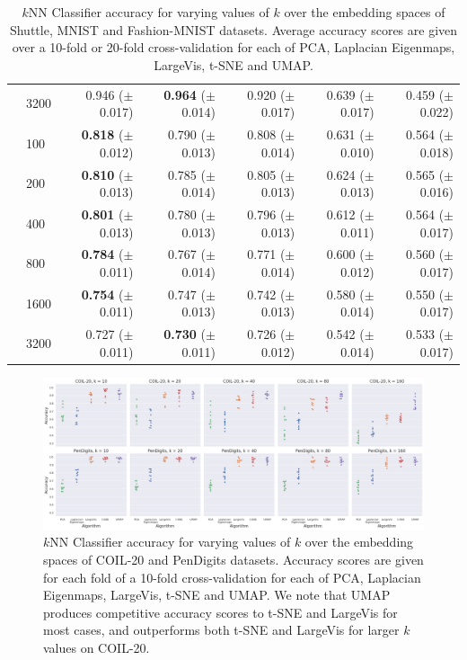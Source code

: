 \documentclass[12pt]{article}
\begin{document}
\begin{table}[!hptb]
\begin{tabular}{ll|rrrrr}
&3200	&0.946	{\tiny ($\pm$ 0.017)}&\textbf{0.964}	{\tiny ($\pm$ 0.014)}&0.920	{\tiny ($\pm$ 0.017)}&0.639	{\tiny ($\pm$ 0.017)}&0.459  {\tiny ($\pm$ 0.022)}\\
\cline{2-7}
\parbox[t]{2mm}{}
&100	&\textbf{0.818}	{\tiny ($\pm$ 0.012)}&0.790	{\tiny ($\pm$ 0.013)}&0.808	{\tiny ($\pm$ 0.014)}&0.631	{\tiny ($\pm$ 0.010)}&0.564  {\tiny ($\pm$ 0.018)}\\
&200	&\textbf{0.810}	{\tiny ($\pm$ 0.013)}&0.785	{\tiny ($\pm$ 0.014)}&0.805	{\tiny ($\pm$ 0.013)}&0.624	{\tiny ($\pm$ 0.013)}&0.565  {\tiny ($\pm$ 0.016)}\\
&400	&\textbf{0.801}	{\tiny ($\pm$ 0.013)}&0.780	{\tiny ($\pm$ 0.013)}&0.796	{\tiny ($\pm$ 0.013)}&0.612	{\tiny ($\pm$ 0.011)}&0.564  {\tiny ($\pm$ 0.017)}\\
&800	&\textbf{0.784}	{\tiny ($\pm$ 0.011)}&0.767	{\tiny ($\pm$ 0.014)}&0.771	{\tiny ($\pm$ 0.014)}&0.600	{\tiny ($\pm$ 0.012)}&0.560  {\tiny ($\pm$ 0.017)}\\
&1600	&\textbf{0.754}	{\tiny ($\pm$ 0.011)}&0.747	{\tiny ($\pm$ 0.013)}&0.742	{\tiny ($\pm$ 0.013)}&0.580	{\tiny ($\pm$ 0.014)}&0.550  {\tiny ($\pm$ 0.017)}\\
&3200	&0.727	{\tiny ($\pm$ 0.011)}&\textbf{0.730}	{\tiny ($\pm$ 0.011)}&0.726	{\tiny ($\pm$ 0.012)}&0.542	{\tiny ($\pm$ 0.014)}&0.533  {\tiny ($\pm$ 0.017)}\\
\bottomrule
\end{tabular}
\caption{$k$NN Classifier accuracy for varying values of $k$ over the embedding spaces of Shuttle, MNIST
    and Fashion-MNIST datasets. Average accuracy scores are given over a 10-fold or 20-fold cross-validation for each of PCA, Laplacian Eigenmaps, LargeVis, t-SNE and UMAP.}\label{table:large-data-accuracy}
\end{table}

\begin{figure}[!hptb]
    \centering
    \includegraphics[width=\textwidth]{small_data_crossval.png}
    \caption{$k$NN Classifier accuracy for varying values of $k$ over the embedding spaces of COIL-20
    and PenDigits datasets. Accuracy scores are given for each fold of a 10-fold cross-validation for
    each of PCA, Laplacian Eigenmaps, LargeVis, t-SNE and UMAP. We note that UMAP produces competitive
    accuracy scores to t-SNE and LargeVis for most cases, and outperforms both t-SNE and LargeVis
    for larger $k$ values on COIL-20.}
    \label{fig:knn_crossval_small_data}
\end{figure}
\end{document}
